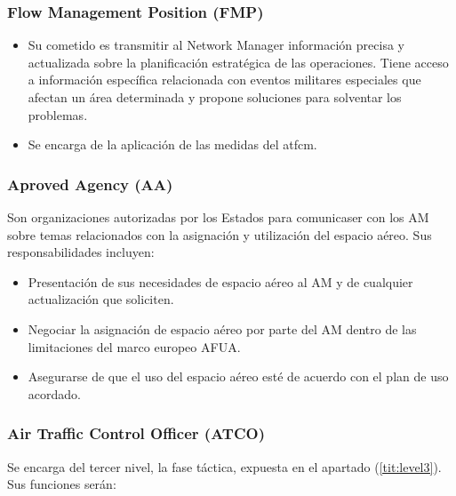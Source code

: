\subsubsection{Flow Management Position (FMP)}

\begin{itemize}
    \item Su cometido es transmitir al Network Manager información precisa y actualizada sobre la planificación estratégica de las operaciones. Tiene acceso a información específica relacionada con eventos militares especiales que afectan un área determinada y propone soluciones para solventar los problemas.
    \item Se encarga de la aplicación de las medidas del \acrfull{atfcm}.
\end{itemize}    

\subsubsection{Aproved Agency (AA)}

Son organizaciones autorizadas por los Estados para comunicaser con los AM sobre temas relacionados con la asignación y utilización del espacio aéreo. Sus responsabilidades incluyen:

\begin{itemize}
    \item Presentación de sus necesidades de espacio aéreo al AM y de cualquier actualización que soliciten.
    \item Negociar la asignación de espacio aéreo por parte del AM dentro de las limitaciones del marco europeo AFUA.
    \item Asegurarse de que el uso del espacio aéreo esté de acuerdo con el plan de uso acordado.
\end{itemize}

\subsubsection{Air Traffic Control Officer (ATCO)}

Se encarga del tercer nivel, la fase táctica, expuesta en el apartado (\ref{tit:level3}). Sus funciones serán:

